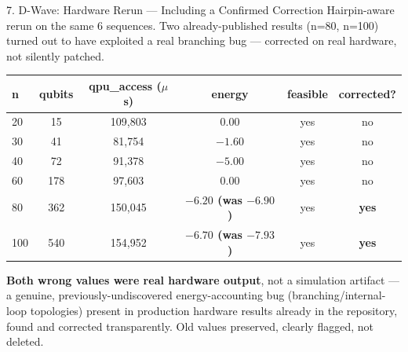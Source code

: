 \documentclass[aspectratio=169,10pt]{beamer}
\begin{document}
\begin{frame}{7. D-Wave: Hardware Rerun --- Including a Confirmed Correction}
  \small Hairpin-aware rerun on the same 6 sequences. Two already-published results (n=80, n=100) turned out to have exploited a real branching bug --- corrected on real hardware, not silently patched.
  \vspace{4pt}
  \begin{center}
  \small
  \begin{tabular}{lccccc}
    \toprule
    \textbf{n} & \textbf{qubits} & \textbf{qpu\_access ($\mu$s)} & \textbf{energy} & \textbf{feasible} & \textbf{corrected?} \\
    \midrule
    20 & 15 & 109{,}803 & 0.00 & yes & no \\
    30 & 41 & 81{,}754 & $-1.60$ & yes & no \\
    40 & 72 & 91{,}378 & $-5.00$ & yes & no \\
    60 & 178 & 97{,}603 & 0.00 & yes & no \\
    80 & 362 & 150{,}045 & \textbf{\color{badred}$-6.20$ (was $-6.90$)} & yes & \textbf{yes} \\
    100 & 540 & 154{,}952 & \textbf{\color{badred}$-6.70$ (was $-7.93$)} & yes & \textbf{yes} \\
    \bottomrule
  \end{tabular}
  \end{center}
  \vspace{6pt}
  \begin{redbox}
  \footnotesize \textbf{Both wrong values were real hardware output}, not a simulation artifact --- a genuine, previously-undiscovered energy-accounting bug (branching/internal-loop topologies) present in production hardware results already in the repository, found and corrected transparently. Old values preserved, clearly flagged, not deleted.
  \end{redbox}
\end{frame}
\end{document}
